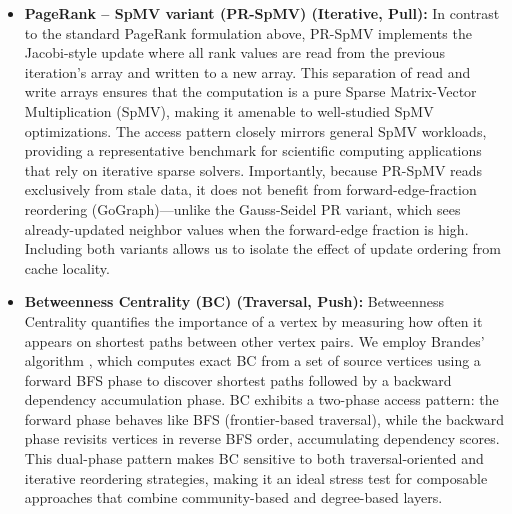 \documentclass[sigconf, nonacm]{acmart}
\begin{document}
\begin{itemize}[topsep=2pt,itemsep=2pt,wide]
\textbf{CC-SV (Shiloach-Vishkin)} is an $O(\log n)$ parallel connectivity algorithm with each of its steps taking $O(m)$ \cite{shiloach_ologn_1982}. The algorithm consists of an intermixed application of two main operations: \emph{hooking} and \emph{shortcutting}. Hooking is when one tree is hooked onto another using edges. The trees are also subject to shortcutting that decreases their height using pointer jumping. 

\textbf{CC-Afforest} \cite{sutton_optimizing_2018} is a sampling-based approach that identifies large components early via subgraph sampling, then verifies membership using link-and-compress on the full graph. This two-phase strategy reduces redundant edge traversals and provides superior performance for graphs with a dominant component.

\item \textbf{PageRank -- SpMV variant (PR-SpMV) (Iterative, Pull): }
In contrast to the standard PageRank formulation above, PR-SpMV implements the Jacobi-style update where all rank values are read from the previous iteration's array and written to a new array. This separation of read and write arrays ensures that the computation is a pure Sparse Matrix-Vector Multiplication (SpMV), making it amenable to well-studied SpMV optimizations. The access pattern closely mirrors general SpMV workloads, providing a representative benchmark for scientific computing applications that rely on iterative sparse solvers. Importantly, because PR-SpMV reads exclusively from stale data, it does not benefit from forward-edge-fraction reordering (GoGraph)---unlike the Gauss-Seidel PR variant, which sees already-updated neighbor values when the forward-edge fraction is high. Including both variants allows us to isolate the effect of update ordering from cache locality.

\item \textbf{Betweenness Centrality (BC) (Traversal, Push): }
Betweenness Centrality quantifies the importance of a vertex by measuring how often it appears on shortest paths between other vertex pairs. We employ Brandes' algorithm \cite{brandes_faster_2001}, which computes exact BC from a set of source vertices using a forward BFS phase to discover shortest paths followed by a backward dependency accumulation phase. BC exhibits a two-phase access pattern: the forward phase behaves like BFS (frontier-based traversal), while the backward phase revisits vertices in reverse BFS order, accumulating dependency scores. This dual-phase pattern makes BC sensitive to both traversal-oriented and iterative reordering strategies, making it an ideal stress test for composable approaches that combine community-based and degree-based layers.
\end{itemize}
\end{document}
